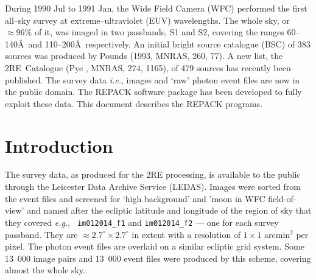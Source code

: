
During 1990 Jul to 1991 Jan, the \ro Wide Field Camera (WFC) performed
the first all--sky survey at extreme--ultraviolet (EUV) wavelengths.
The whole sky, or $\approx 96$\% of it, was imaged in two passbands, S1
and S2, covering the ranges 60--140\AA~and 110--200\AA~respectively.
An initial bright source catalogue (BSC) of 383 sources was produced by
Pounds \etal (1993, MNRAS, 260, 77).  A new list, the 2RE~Catalogue
(Pye , MNRAS, 274, 1165), of 479 sources has recently been
published.  The survey data \emph{i.e.}, images and `raw' photon event files
are now in the public domain.  The REPACK software package has been
developed to fully exploit these data.  This document describes the
REPACK programs.

 \newpage
 \begin{latexonly}
   \setlength{\parskip}{0mm}
   \latexonlytoc
   \setlength{\parskip}{\medskipamount}
   \markright{\stardocname}
 \end{latexonly}
\newpage
\renewcommand{\thepage}{\arabic{page}}
\setcounter{page}{1}

\section{\label{se_introduction}Introduction}

The survey data, as produced for the 2RE processing, is available to
the public through the Leicester Data Archive Service (LEDAS). Images
were sorted from the event files and screened for `high background' and
'moon in WFC field-of-view' and named after the ecliptic latitude and
longitude of the region of sky that they covered \emph{e.g.}, {\tt
im012014\_f1} and {\tt im012014\_f2} --- one for each survey passband.
They are $\approx 2.7^{\circ} \times 2.7^{\circ}$ in extent with a
resolution of $1 \times 1$ arcmin$^{2}$ per pixel.  The photon event
files are overlaid on a similar ecliptic grid system.  Some 13~000
image pairs and 13~000 event files were produced by this scheme,
covering almost the whole sky.


